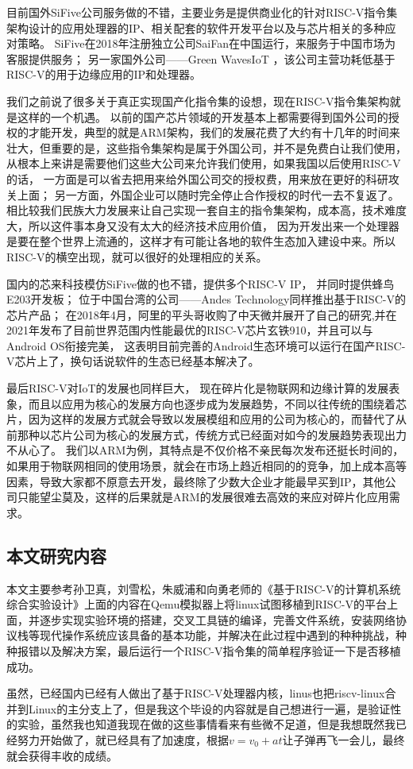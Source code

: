 目前国外SiFive公司服务做的不错，主要业务是提供商业化的针对RISC-V指令集架构设计的应用处理器的IP、相关配套的软件开发平台以及与芯片相关的多种应对策略。
SiFive在2018年注册独立公司SaiFan在中国运行，来服务于中国市场为客服提供服务；
另一家国外公司——Green WavesIoT ，该公司主营功耗低基于RISC-V的用于边缘应用的IP和处理器\cite{Risc-V_development}。

我们之前说了很多关于真正实现国产化指令集的设想，现在RISC-V指令集架构就是这样的一个机遇。
以前的国产芯片领域的开发基本上都需要得到国外公司的授权的才能开发，典型的就是ARM架构，我们的发展花费了大约有十几年的时间来壮大，但重要的是，这些指令集架构是属于外国公司，并不是免费白让我们使用，从根本上来讲是需要他们这些大公司来允许我们使用，如果我国以后使用RISC-V的话，
一方面是可以省去把用来给外国公司交的授权费，用来放在更好的科研攻关上面；
另一方面，外国企业可以随时完全停止合作授权的时代一去不复返了。相比较我们民族大力发展来让自己实现一套自主的指令集架构，成本高，技术难度大，所以这件事本身又没有太大的经济技术应用价值，
因为开发出来一个处理器是要在整个世界上流通的，这样才有可能让各地的软件生态加入建设中来。所以RISC-V的横空出现，就可以很好的处理相应的关系。

国内的芯来科技模仿SiFive做的也不错，提供多个RISC-V IP， 并同时提供蜂鸟E203开发板； 
位于中国台湾的公司——Andes Technology同样推出基于RISC-V的芯片产品； 
在2018年4月，阿里的平头哥收购了中天微并展开了自己的研究,并在2021年发布了目前世界范围内性能最优的RISC-V芯片玄铁910，并且可以与Android OS衔接完美，
这表明目前完善的Android生态环境可以运行在国产RISC-V芯片上了，换句话说软件的生态已经基本解决了。

最后RISC-V对IoT的发展也同样巨大，
现在碎片化是物联网和边缘计算的发展表象，而且以应用为核心的发展方向也逐步成为发展趋势，不同以往传统的围绕着芯片，因为这样的发展方式就会导致以发展模组和应用的公司为核心的，而替代了从前那种以芯片公司为核心的发展方式，传统方式已经面对如今的发展趋势表现出力不从心了。
我们以ARM为例，其特点是不仅价格不亲民每次发布还挺长时间的，如果用于物联网相同的使用场景，就会在市场上趋近相同的的竞争，加上成本高等因素，导致大家都不原意去开发，最终除了少数大企业才能最早买到IP，其他公司只能望尘莫及，这样的后果就是ARM的发展很难去高效的来应对碎片化应用需求。

\subsection{本文研究内容}
本文主要参考孙卫真，刘雪松，朱威浦和向勇老师的《基于RISC-V的计算机系统综合实验设计》\cite{基于RISC-V的计算机系统综合实验设计}上面的内容在Qemu模拟器上将linux试图移植到RISC-V的平台上面，并逐步实现实验环境的搭建，交叉工具链的编译，完善文件系统，安装网络协议栈等现代操作系统应该具备的基本功能，并解决在此过程中遇到的种种挑战，种种报错以及解决方案，最后运行一个RISC-V指令集的简单程序验证一下是否移植成功。

虽然，已经国内已经有人做出了基于RISC-V处理器内核，linus也把riscv-linux合并到Linux的主分支上了，但是我这个毕设的内容就是自己想进行一遍，是验证性的实验，虽然我也知道我现在做的这些事情看来有些微不足道，但是我想既然我已经努力开始做了，就已经具有了加速度，根据$v= v_{0} + at $让子弹再飞一会儿，最终就会获得丰收的成绩。



